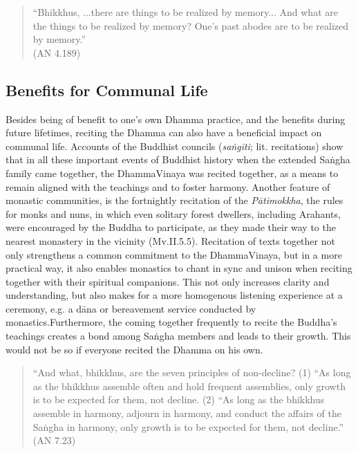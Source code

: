 \begin{quote}
  ``Bhikkhus, ...there are things to be realized by memory... And what are the things to be realized by memory? One's past abodes are to be realized by memory.''\ifninebythirteen\\\fi (AN 4.189)
\end{quote}

\subsection*{Benefits for Communal Life}

Besides being of benefit to one's own Dhamma practice, and the benefits during future lifetimes, reciting the Dhamma can also have a beneficial impact on communal life. Accounts of the Buddhist councils (\textit{saṅgīti}; lit. recitations) show that in all these important events of Buddhist history when the extended Saṅgha family came together, the DhammaVinaya was recited together, as a means to remain aligned with the teachings and to foster harmony. Another feature of monastic communities, is the fortnightly recitation of the \textit{Pātimokkha}, the rules for monks and nuns, in which even solitary forest dwellers, including Arahants, were encouraged by the Buddha to participate, as they made their way to the nearest monastery in the vicinity (Mv.II.5.5). Recitation of texts together not only strengthens a common commitment to the DhammaVinaya, but in a more practical way, it also enables monastics to chant in sync and unison when reciting together with their spiritual companions. This not only increases clarity and understanding, but also makes for a more homogenous listening experience at a ceremony, e.g. a dāna or bereavement service conducted by monastics.\ifninebythirteen\clearpage\fi Furthermore, the coming together frequently to recite the Buddha's teachings creates a bond among Saṅgha members and leads to their growth. This would not be so if everyone recited the Dhamma on his own.

\begin{quote}
  ``And what, bhikkhus, are the seven principles of non-decline? (1) ``As long as the bhikkhus assemble often and hold frequent assemblies, only growth is to be expected for them, not decline. (2) ``As long as the bhikkhus assemble in harmony, adjourn in harmony, and conduct the affairs of the Saṅgha in harmony, only growth is to be expected for them, not decline.'' (AN 7.23)
\end{quote}

